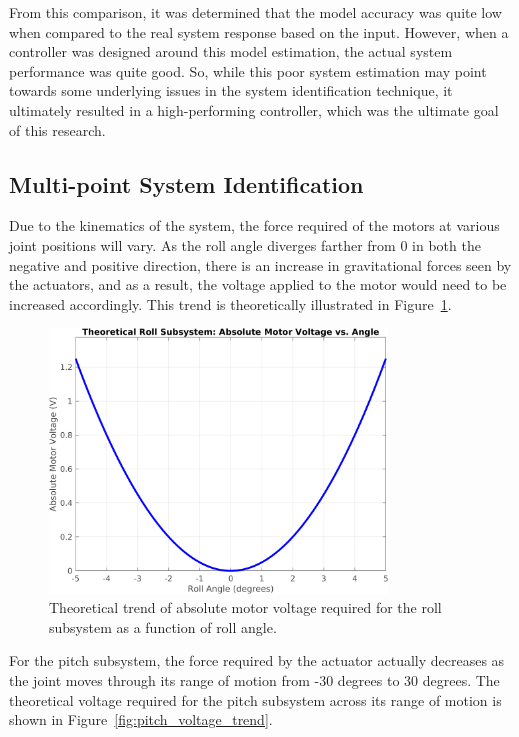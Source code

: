 From this comparison, it was determined that the model accuracy was quite low when compared to the real system response based on the input. However, when a controller was designed around this model estimation, the actual system performance was quite good. So, while this poor system estimation may point towards some underlying issues in the system identification technique, it ultimately resulted in a high-performing controller, which was the ultimate goal of this research.


\subsection{Multi-point System Identification}

Due to the kinematics of the system, the force required of the motors at various joint positions will vary. As the roll angle diverges farther from 0 in both the negative and positive direction, there is an increase in gravitational forces seen by the actuators, and as a result, the voltage applied to the motor would need to be increased accordingly. This trend is theoretically illustrated in Figure~\ref{fig:roll_voltage_trend}.

\begin{figure}[htbp]
    \centering
    \includegraphics[width=0.8\textwidth]{figures/Roll_Subsystem_Theoretical_Trend.png}
    \caption{Theoretical trend of absolute motor voltage required for the roll subsystem as a function of roll angle.}
    \label{fig:roll_voltage_trend}
\end{figure}

For the pitch subsystem, the force required by the actuator actually decreases as the joint moves through its range of motion from -30 degrees to 30 degrees. The theoretical voltage required for the pitch subsystem across its range of motion is shown in Figure~\ref{fig:pitch_voltage_trend}.

